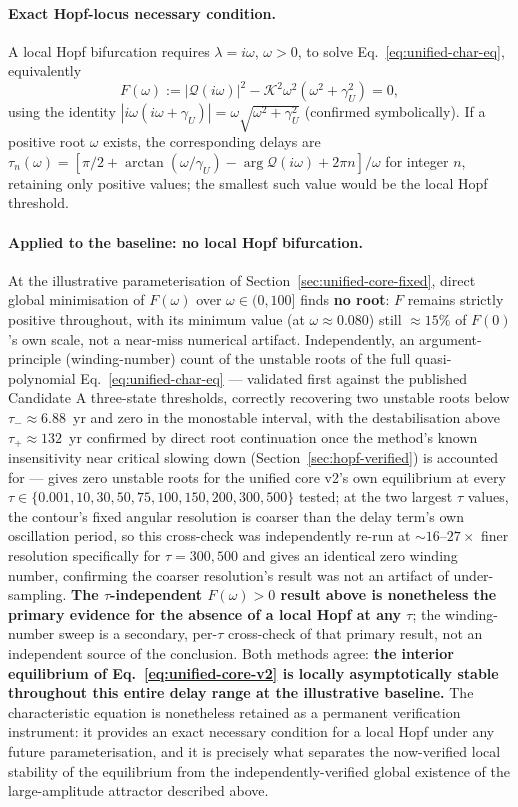 \documentclass[twocolumn,10pt]{article}
\begin{document}
\paragraph{Exact Hopf-locus necessary condition.} A local Hopf bifurcation requires $\lambda=i\omega$, $\omega>0$, to solve Eq.~\eqref{eq:unified-char-eq}, equivalently
\[
F(\omega) := |\mathcal Q(i\omega)|^2 - \mathcal K^2\omega^2(\omega^2+\gamma_U^2) = 0,
\]
using the identity $|i\omega(i\omega+\gamma_U)|=\omega\sqrt{\omega^2+\gamma_U^2}$ (confirmed symbolically). If a positive root $\omega$ exists, the corresponding delays are $\tau_n(\omega)=[\pi/2+\arctan(\omega/\gamma_U)-\arg\mathcal Q(i\omega)+2\pi n]/\omega$ for integer $n$, retaining only positive values; the smallest such value would be the local Hopf threshold.

\paragraph{Applied to the baseline: no local Hopf bifurcation.} At the illustrative parameterisation of Section~\ref{sec:unified-core-fixed}, direct global minimisation of $F(\omega)$ over $\omega\in(0,100]$ finds \textbf{no root}: $F$ remains strictly positive throughout, with its minimum value (at $\omega\approx0.080$) still $\approx15\%$ of $F(0)$'s own scale, not a near-miss numerical artifact. Independently, an argument-principle (winding-number) count of the unstable roots of the full quasi-polynomial Eq.~\eqref{eq:unified-char-eq} --- validated first against the published Candidate A three-state thresholds, correctly recovering two unstable roots below $\tau_-\approx6.88$~yr and zero in the monostable interval, with the destabilisation above $\tau_+\approx132$~yr confirmed by direct root continuation once the method's known insensitivity near critical slowing down (Section~\ref{sec:hopf-verified}) is accounted for --- gives zero unstable roots for the unified core v2's own equilibrium at every $\tau\in\{0.001,10,30,50,75,100,150,200,300,500\}$ tested; at the two largest $\tau$ values, the contour's fixed angular resolution is coarser than the delay term's own oscillation period, so this cross-check was independently re-run at $\sim16$--$27\times$ finer resolution specifically for $\tau=300,500$ and gives an identical zero winding number, confirming the coarser resolution's result was not an artifact of under-sampling. \textbf{The $\tau$-independent $F(\omega)>0$ result above is nonetheless the primary evidence for the absence of a local Hopf at any $\tau$}; the winding-number sweep is a secondary, per-$\tau$ cross-check of that primary result, not an independent source of the conclusion. Both methods agree: \textbf{the interior equilibrium of Eq.~\eqref{eq:unified-core-v2} is locally asymptotically stable throughout this entire delay range at the illustrative baseline.} The characteristic equation is nonetheless retained as a permanent verification instrument: it provides an exact necessary condition for a local Hopf under any future parameterisation, and it is precisely what separates the now-verified local stability of the equilibrium from the independently-verified global existence of the large-amplitude attractor described above.
\end{document}
